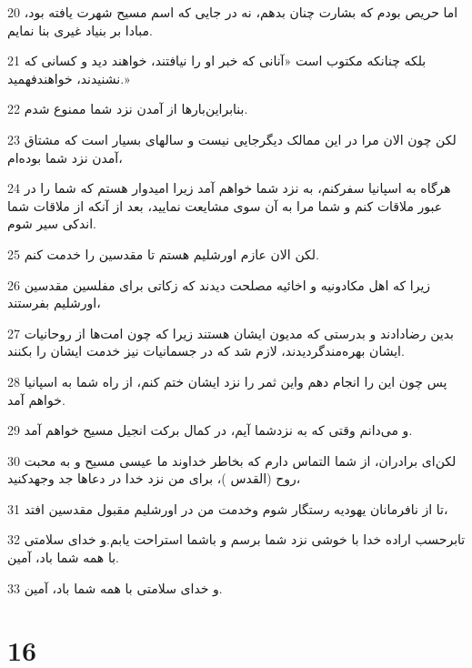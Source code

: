 \par 20 اما حریص بودم که بشارت چنان بدهم، نه در جایی که اسم مسیح شهرت یافته بود، مبادا بر بنیاد غیری بنا نمایم.
\par 21 بلکه چنانکه مکتوب است «آنانی که خبر او را نیافتند، خواهند دید و کسانی که نشنیدند، خواهندفهمید.»
\par 22 بنابراین‌بارها از آمدن نزد شما ممنوع شدم.
\par 23 لکن چون الان مرا در این ممالک دیگرجایی نیست و سالهای بسیار است که مشتاق آمدن نزد شما بوده‌ام،
\par 24 هرگاه به اسپانیا سفرکنم، به نزد شما خواهم آمد زیرا امیدوار هستم که شما را در عبور ملاقات کنم و شما مرا به آن سوی مشایعت نمایید، بعد از آنکه از ملاقات شما اندکی سیر شوم.
\par 25 لکن الان عازم اورشلیم هستم تا مقدسین را خدمت کنم.
\par 26 زیرا که اهل مکادونیه و اخائیه مصلحت دیدند که زکاتی برای مفلسین مقدسین اورشلیم بفرستند،
\par 27 بدین رضادادند و بدرستی که مدیون ایشان هستند زیرا که چون امت‌ها از روحانیات ایشان بهره‌مندگردیدند، لازم شد که در جسمانیات نیز خدمت ایشان را بکنند.
\par 28 پس چون این را انجام دهم واین ثمر را نزد ایشان ختم کنم، از راه شما به اسپانیا خواهم آمد.
\par 29 و می‌دانم وقتی که به نزدشما آیم، در کمال برکت انجیل مسیح خواهم آمد.
\par 30 لکن‌ای برادران، از شما التماس دارم که بخاطر خداوند ما عیسی مسیح و به محبت روح (القدس )، برای من نزد خدا در دعاها جد وجهدکنید،
\par 31 تا از نافرمانان یهودیه رستگار شوم وخدمت من در اورشلیم مقبول مقدسین افتد،
\par 32 تابرحسب اراده خدا با خوشی نزد شما برسم و باشما استراحت یابم.و خدای سلامتی با همه شما باد، آمین.
\par 33 و خدای سلامتی با همه شما باد، آمین.

\chapter{16}

